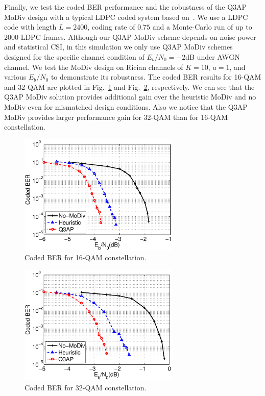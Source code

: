 \documentclass[journal]{IEEEtran}
\begin{document}
Finally, we test the coded BER performance and the robustness of the Q3AP MoDiv
design with a typical LDPC coded system based on~\cite{hochwald2003achieving}.
We use a LDPC code with length $L=2400$, coding rate of $0.75$ and a
Monte-Carlo run of up to 2000 LDPC frames. Although our Q3AP MoDiv scheme
depends on noise power and statistical CSI, in this simulation we only use Q3AP
MoDiv schemes designed for the specific channel condition of $E_b/N_0=-2$dB
under AWGN channel.
We test the MoDiv design on Rician channels of $K=10$, $a=1$, and various
$E_b/N_0$ to demonstrate its robustness. The coded BER results for 16-QAM and
32-QAM are plotted in Fig.~\ref{fig:coded_BER16QAM} and
Fig.~\ref{fig:coded_BER32QAM}, respectively. We can see that the Q3AP MoDiv
solution provides additional gain over the heuristic MoDiv and no MoDiv even for
mismatched design conditions. Also we notice that the Q3AP MoDiv provides larger
performance gain for 32-QAM than for 16-QAM constellation.

\begin{figure}[!t]
    \centering
    \includegraphics[width=3.0in]{./figs/coded_BER16QAM.eps}
    \caption{Coded BER for 16-QAM constellation.}
    \label{fig:coded_BER16QAM}
\end{figure}

\begin{figure}[!t]
    \centering
    \includegraphics[width=3.0in]{./figs/coded_BER32QAM.eps}
    \caption{Coded BER for 32-QAM constellation.}
    \label{fig:coded_BER32QAM}
\end{figure}
\end{document}
